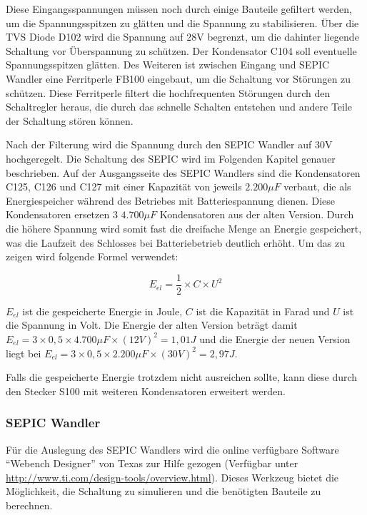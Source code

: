 Diese Eingangsspannungen müssen noch durch einige Bauteile gefiltert werden, um die Spannungsspitzen zu glätten und
die Spannung zu stabilisieren. Über die \ac{TVS} Diode D102 wird die Spannung auf 28V begrenzt, um die dahinter liegende
Schaltung vor Überspannung zu schützen. Der Kondensator C104 soll eventuelle Spannungsspitzen glätten. Des Weiteren
ist zwischen Eingang und \ac{SEPIC} Wandler eine Ferritperle FB100 eingebaut, um die Schaltung vor Störungen zu schützen.
Diese Ferritperle filtert die hochfrequenten Störungen durch den Schaltregler heraus, die durch das schnelle Schalten
entstehen und andere Teile der Schaltung stören können.

Nach der Filterung wird die Spannung durch den \ac{SEPIC} Wandler auf 30V hochgeregelt. Die Schaltung des \ac{SEPIC}
wird im Folgenden Kapitel genauer beschrieben. Auf der Ausgangsseite des \ac{SEPIC} Wandlers sind die Kondensatoren
C125, C126 und C127 mit einer Kapazität von jeweils \(2.200 \mu F\) verbaut, die als Energiespeicher während des
Betriebes mit Batteriespannung dienen. Diese Kondensatoren ersetzen 3 \(4.700 \mu F\) Kondensatoren aus der alten Version.
Durch die höhere Spannung wird somit fast die dreifache Menge an Energie gespeichert, was die Laufzeit des Schlosses
bei Batteriebetrieb deutlich erhöht. Um das zu zeigen wird folgende Formel verwendet:

\[E_{el} = \frac{1}{2} \times C \times U^2\]

\(E_{el}\) ist die gespeicherte Energie in Joule, \(C\) ist die Kapazität in Farad und \(U\) ist die Spannung in Volt.
Die Energie der alten Version beträgt damit \(E_{el} = 3 \times 0,5 \times 4.700 \mu F \times (12V)^2 = 1,01 J\) und die Energie der neuen
Version liegt bei \(E_{el} = 3 \times 0,5 \times 2.200 \mu F \times (30V)^2 = 2,97 J\).

Falls die gespeicherte Energie trotzdem nicht ausreichen sollte, kann diese durch den Stecker S100 mit weiteren Kondensatoren
erweitert werden.

\clearpage

\subsubsection{SEPIC Wandler}
Für die Auslegung des \ac{SEPIC} Wandlers wird die online verfügbare Software \enquote{Webench Designer} von Texas
zur Hilfe gezogen (Verfügbar unter \url{http://www.ti.com/design-tools/overview.html}). Dieses Werkzeug bietet die
Möglichkeit, die Schaltung zu simulieren und die benötigten Bauteile zu berechnen.


